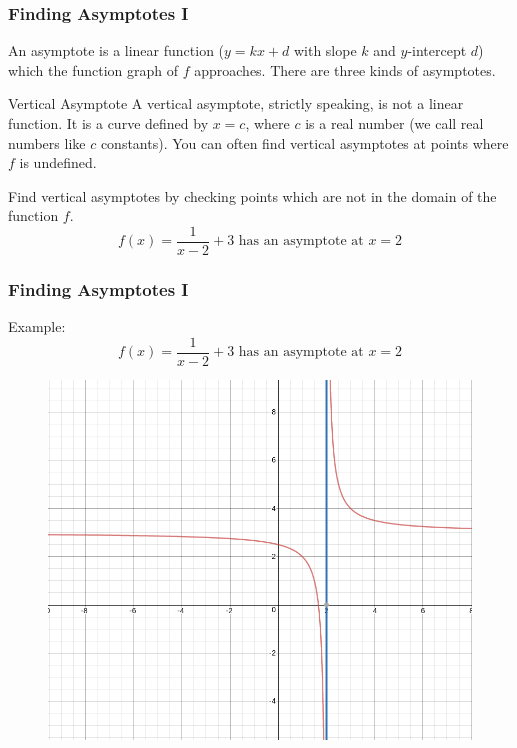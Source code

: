 \documentclass[xcolor=dvipsnames]{beamer}
\begin{document}
\begin{frame}
  \frametitle{Finding Asymptotes I}
An asymptote is a linear function ($y=kx+d$ with slope $k$ and
$y$-intercept $d$) which the function graph of $f$ approaches. There
are three kinds of asymptotes.
\begin{block}{Vertical Asymptote}
  A vertical asymptote, strictly speaking, is not a linear function.
  It is a curve defined by $x=c$, where $c$ is a real number (we call
  real numbers like $c$ \alert{constants}). You can often find
  vertical asymptotes at points where $f$ is undefined.
\end{block}
Find vertical asymptotes by checking points which are not in the
domain of the function $f$. 
\begin{equation}
  \label{eq:peimoojo}
f(x)=\frac{1}{x-2}+3\mbox{ has an asymptote at }x=2
\end{equation}
\end{frame}

\begin{frame}
  \frametitle{Finding Asymptotes I}
Example:
\begin{equation}
  \label{eq:maugeish}
f(x)=\frac{1}{x-2}+3\mbox{ has an asymptote at }x=2
\end{equation}
\begin{figure}[h]
\includegraphics[scale=.25]{./diagrams/asymp1.png}
\end{figure}
\end{frame}
\end{document}

